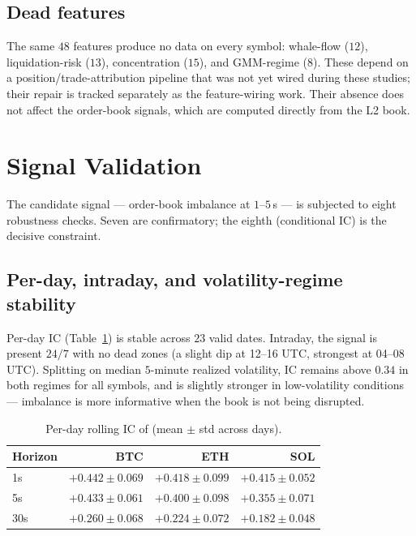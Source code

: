 \documentclass[11pt]{article}
\newcommand{\toprule}{\hline}
\newcommand{\midrule}{\hline}
\newcommand{\bottomrule}{\hline}
\newcommand{\code}[1]{\texttt{\detokenize{#1}}}
\newcommand{\ic}{\textnormal{IC}}
\begin{document}
\subsection{Dead features}\label{sec:dead}
The same $48$ features produce no data on every symbol: whale-flow ($12$),
liquidation-risk ($13$), concentration ($15$), and GMM-regime ($8$). These depend on a
position/trade-attribution pipeline that was not yet wired during these studies; their
repair is tracked separately as the feature-wiring work. Their absence does not affect the
order-book signals, which are computed directly from the L2 book.

\section{Signal Validation}\label{sec:validation}

The candidate signal --- order-book imbalance at $1$--$5\,$s --- is subjected to eight
robustness checks. Seven are confirmatory; the eighth (conditional \ic) is the decisive
constraint.

\subsection{Per-day, intraday, and volatility-regime stability}
Per-day \ic{} (Table~\ref{tab:perday}) is stable across $23$ valid dates. Intraday, the
signal is present $24/7$ with no dead zones (a slight dip at 12--16 UTC, strongest at
04--08 UTC). Splitting on median $5$-minute realized volatility, \ic{} remains above $0.34$
in both regimes for all symbols, and is slightly stronger in low-volatility conditions
--- imbalance is more informative when the book is not being disrupted.

\begin{table}[h]
\centering\footnotesize
\setlength{\tabcolsep}{5pt}
\caption{Per-day rolling \ic{} of \code{imbalance_qty_l1} (mean $\pm$ std across days).}
\label{tab:perday}
\begin{tabular}{lrrr}
\toprule
Horizon & BTC & ETH & SOL \\
\midrule
1s  & $+0.442 \pm 0.069$ & $+0.418 \pm 0.099$ & $+0.415 \pm 0.052$ \\
5s  & $+0.433 \pm 0.061$ & $+0.400 \pm 0.098$ & $+0.355 \pm 0.071$ \\
30s & $+0.260 \pm 0.068$ & $+0.224 \pm 0.072$ & $+0.182 \pm 0.048$ \\
\bottomrule
\end{tabular}
\end{table}
\end{document}
